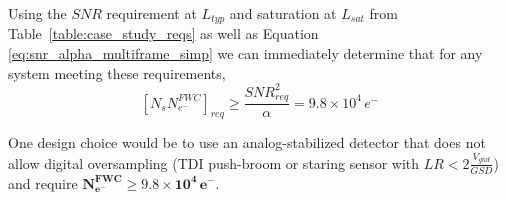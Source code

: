 \documentclass[]{spieman}  %
\begin{document}
\begin{table}[t]
\centering
{}
\caption{Case study requirements and assumptions.}
\label{table:case_study_reqs}
\end{table}

Using the $SNR$ requirement at $L_{typ}$ and saturation at $L_{sat}$ from Table~\ref{table:case_study_reqs} as well as Equation \eqref{eq:snr_alpha_multiframe_simp} we can immediately determine that for any system meeting these requirements,
\begin{equation}
    \left[N_sN_{e^-}^{FWC}\right]_{req} \geq \frac{SNR_{req}^2}{\alpha} = 9.8\times 10^4 \, e^-
    \label{eq:NsNeFWC_req}
\end{equation}

One design choice would be to use an analog-stabilized detector that does not allow digital oversampling (TDI push-broom or staring sensor with $LR < 2\frac{V_{gnd}}{GSD}$) and require $\mathbf{N_{e^-}^{FWC} \geq 9.8\times 10^4 \, e^-}$.  
\end{document}

